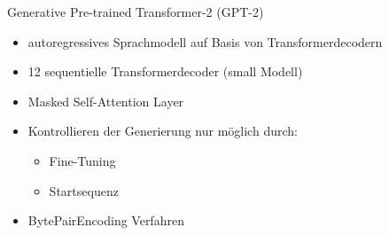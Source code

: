 \begin{frame}{Generative Pre-trained Transformer-2 (GPT-2)}

  \begin{itemize}
    \item autoregressives Sprachmodell auf Basis von Transformerdecodern
    \item 12 sequentielle Transformerdecoder (small Modell)
    \item Masked Self-Attention Layer
    \item Kontrollieren der Generierung nur möglich durch: \begin{itemize} \item Fine-Tuning \item Startsequenz \end{itemize}
    \item BytePairEncoding Verfahren

  \end{itemize}
 
\end{frame}

